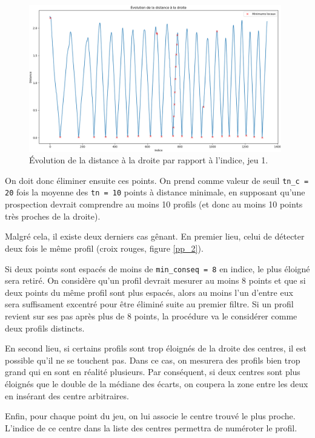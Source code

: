 \documentclass[12pt]{article}
\begin{document}
    \begin{figure}[ht!]
        \centering
        \includegraphics[width=0.98\textwidth]{Images/PseudoProf_dist_1.png}  
        \caption{\label{pp_1} Évolution de la distance à la droite par rapport à l'indice, jeu 1.}
    \end{figure}

    On doit donc éliminer ensuite ces points. On prend comme valeur de seuil \texttt{tn\_c = 20} fois la moyenne des \texttt{tn = 10} points à distance minimale, en supposant qu'une prospection devrait comprendre au moins 10 profils (et donc au moins 10 points très proches de la droite).

    \vskip 15pt
    
    Malgré cela, il existe deux derniers cas gênant. En premier lieu, celui de détecter deux fois le même profil (croix rouges, figure \ref{pp_2}).

    Si deux points sont espacés de moins de \texttt{min\_conseq = 8} en indice, le plus éloigné sera retiré. On considère qu'un profil devrait mesurer au moins 8 points et que si deux points du même profil sont plus espacés, alors au moins l'un d'entre eux sera suffisament excentré pour être éliminé suite au premier filtre. Si un profil revient sur ses pas après plus de 8 points, la procédure va le considérer comme deux profils distincts.

    En second lieu, si certains profils sont trop éloignés de la droite des centres, il est possible qu'il ne se touchent pas. Dans ce cas, on mesurera des profils bien trop grand qui en sont en réalité plusieurs. Par conséquent, si deux centres sont plus éloignés que le double de la médiane des écarts, on coupera la zone entre les deux en insérant des centre arbitraires.

    Enfin, pour chaque point du jeu, on lui associe le centre trouvé le plus proche. L'indice de ce centre dans la liste des centres permettra de numéroter le profil.
\end{document}
